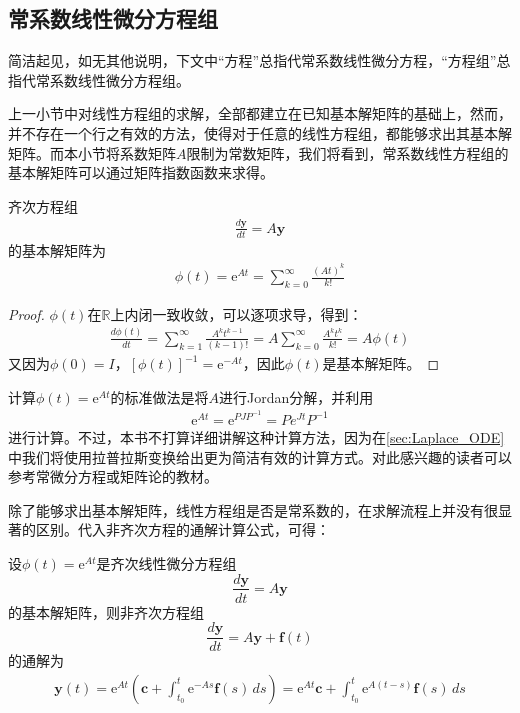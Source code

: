 \subsection{常系数线性微分方程组}\label{sub:constant_coefficient_linear_equation_system}

简洁起见，如无其他说明，下文中“方程”总指代常系数线性微分方程，“方程组”总指代常系数线性微分方程组。

上一小节中对线性方程组的求解，全部都建立在已知基本解矩阵的基础上，然而，并不存在一个行之有效的方法，使得对于任意的线性方程组，都能够求出其基本解矩阵。而本小节将系数矩阵$A$限制为常数矩阵，我们将看到，常系数线性方程组的基本解矩阵可以通过矩阵指数函数来求得。

\begin{theorem}
    齐次方程组\begin{align*}
    \frac{d\mathbf{y}}{dt}=A\mathbf{y}
    \end{align*}
    的基本解矩阵为\begin{align*}
    \phi(t)=\mathrm{e}^{At}=\sum_{k=0}^{\infty}\frac{(At)^k}{k!}
    \end{align*}
\end{theorem}
\begin{proof}
    $\phi(t)$在$\mathbb{R}$上内闭一致收敛，可以逐项求导，得到：
    \begin{align*}
    \frac{d\phi(t)}{dt}=\sum_{k=1}^{\infty}\frac{A^k t^{k-1}}{(k-1)!}=A\sum_{k=0}^{\infty}\frac{A^k t^k}{k!}=A\phi(t)
    \end{align*}
    又因为$\phi(0)=I$，$[\phi(t)]^{-1}=\mathrm{e}^{-At}$，因此$\phi(t)$是基本解矩阵。
\end{proof}

计算$\phi(t)=\mathrm{e}^{At}$的标准做法是将$A$进行Jordan分解，并利用\begin{align*}
    \mathrm{e}^{At}=\mathrm{e}^{PJP^{-1}}=Pe^{Jt}P^{-1}
\end{align*}
进行计算。不过，本书不打算详细讲解这种计算方法，因为在\ref{sec:Laplace_ODE}中我们将使用拉普拉斯变换给出更为简洁有效的计算方式。对此感兴趣的读者可以参考常微分方程\cite{ode}或矩阵论的教材。

除了能够求出基本解矩阵，线性方程组是否是常系数的，在求解流程上并没有很显著的区别。代入非齐次方程的通解计算公式，可得：
\begin{theorem}
    设$\phi(t)=\mathrm{e}^{At}$是齐次线性微分方程组
    $$\frac{d\mathbf{y}}{dt}=A\mathbf{y}$$
    的基本解矩阵，则非齐次方程组
    $$\frac{d\mathbf{y}}{dt}=A\mathbf{y}+\mathbf{f}(t)$$
    的通解为\begin{align*}
    \mathbf{y}(t)=\mathrm{e}^{At}\left(\mathbf{c}+\int_{t_0}^t \mathrm{e}^{-As}\mathbf{f}(s)\,ds\right)=\mathrm{e}^{At}\mathbf{c}+\int_{t_0}^t \mathrm{e}^{A(t-s)}\mathbf{f}(s)\,ds
    \end{align*}
\end{theorem}

